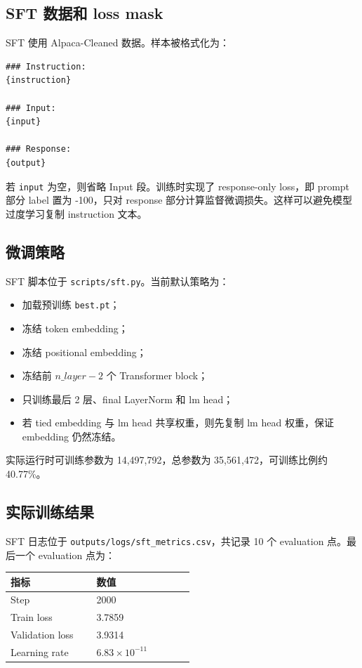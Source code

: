 \documentclass[UTF8,zihao=-4]{ctexart}
\begin{document}
\subsection{SFT 数据和 loss mask}

SFT 使用 Alpaca-Cleaned 数据。样本被格式化为：

\begin{lstlisting}
### Instruction:
{instruction}

### Input:
{input}

### Response:
{output}
\end{lstlisting}

若 \texttt{input} 为空，则省略 Input 段。训练时实现了 response-only loss，即 prompt 部分 label 置为 -100，只对 response 部分计算监督微调损失。这样可以避免模型过度学习复制 instruction 文本。

\subsection{微调策略}

SFT 脚本位于 \texttt{scripts/sft.py}。当前默认策略为：

\begin{itemize}
  \item 加载预训练 \texttt{best.pt}；
  \item 冻结 token embedding；
  \item 冻结 positional embedding；
  \item 冻结前 $n\_layer-2$ 个 Transformer block；
  \item 只训练最后 2 层、final LayerNorm 和 lm head；
  \item 若 tied embedding 与 lm head 共享权重，则先复制 lm head 权重，保证 embedding 仍然冻结。
\end{itemize}

实际运行时可训练参数为 14,497,792，总参数为 35,561,472，可训练比例约 40.77\%。

\subsection{实际训练结果}

SFT 日志位于 \texttt{outputs/logs/sft\_metrics.csv}，共记录 10 个 evaluation 点。最后一个 evaluation 点为：

\begin{longtable}{>{\raggedright\arraybackslash}p{0.24\linewidth}p{0.28\linewidth}}
\toprule
\textbf{指标} & \textbf{数值} \\
\midrule
Step & 2000 \\
Train loss & 3.7859 \\
Validation loss & 3.9314 \\
Learning rate & $6.83\times 10^{-11}$ \\
\bottomrule
\end{longtable}
\end{document}
